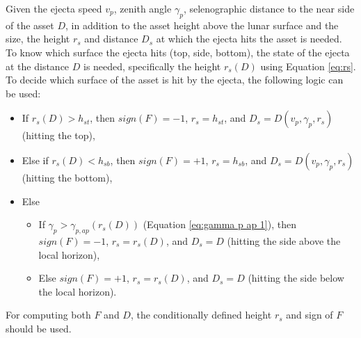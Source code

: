 \documentclass{article}
\begin{document}
Given the ejecta speed $v_p$, zenith angle $\gamma_p$, selenographic distance to the near side of the asset $D$, in addition to the asset height above the lunar surface and the size, the height $r_s$ and distance $D_s$ at which the ejecta hits the asset is needed. To know which surface the ejecta hits (top, side, bottom), the state of the ejecta at the distance $D$ is needed, specifically the height $r_s(D)$ using Equation \eqref{eq:rs}. To decide which surface of the asset is hit by the ejecta, the following logic can be used:
\begin{itemize}
	\item If $r_s(D) > h_{st}$, then $sign(F) = -1$, $r_s = h_{st}$, and $D_s = D(v_p, \gamma_p, r_s)$ (hitting the top),
	\item Else if $r_s(D) < h_{sb}$, then $sign(F) = +1$, $r_s = h_{sb}$, and $D_s = D(v_p, \gamma_p, r_s)$ (hitting the bottom),
	\item Else
	\begin{itemize}
		\item If $\gamma_p > \gamma_{p,ap}(r_s(D))$ (Equation \eqref{eq:gamma p ap 1}), then $sign(F) = -1$, $r_s = r_s(D)$, and $D_s = D$ (hitting the side above the local horizon),
		\item Else $sign(F) = +1$, $r_s = r_s(D)$, and $D_s = D$ (hitting the side below the local horizon).
	\end{itemize}
\end{itemize}
For computing both $F$ and $D$, the conditionally defined height $r_s$ and sign of $F$ should be used.
\end{document}
